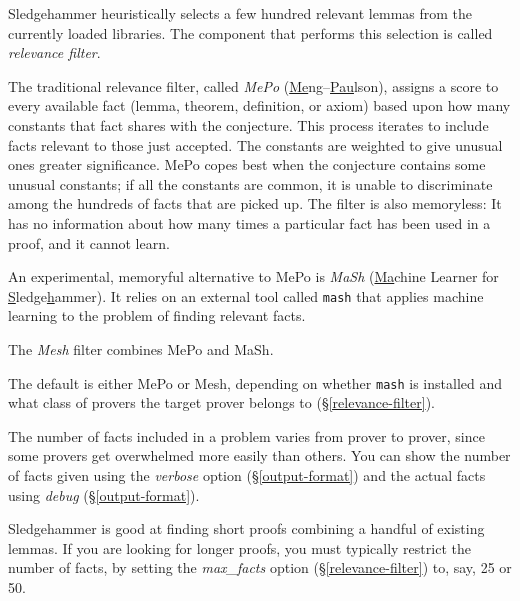 \documentclass[a4paper,12pt]{article}
\begin{document}

Sledgehammer heuristically selects a few hundred relevant lemmas from the
currently loaded libraries. The component that performs this selection is
called \emph{relevance filter}.

\begin{enum}
\item[\labelitemi]
The traditional relevance filter, called \emph{MePo}
(\underline{Me}ng--\underline{Pau}lson), assigns a score to every available fact
(lemma, theorem, definition, or axiom) based upon how many constants that fact
shares with the conjecture. This process iterates to include facts relevant to
those just accepted. The constants are weighted to give unusual ones greater
significance. MePo copes best when the conjecture contains some unusual
constants; if all the constants are common, it is unable to discriminate among
the hundreds of facts that are picked up. The filter is also memoryless: It has
no information about how many times a particular fact has been used in a proof,
and it cannot learn.

\item[\labelitemi]
An experimental, memoryful alternative to MePo is \emph{MaSh}
(\underline{Ma}chine Learner for \underline{S}ledge\underline{h}ammer). It
relies on an external tool called \texttt{mash} that applies machine learning to
the problem of finding relevant facts.

\item[\labelitemi] The \emph{Mesh} filter combines MePo and MaSh.
\end{enum}

The default is either MePo or Mesh, depending on whether \texttt{mash} is
installed and what class of provers the target prover belongs to
(\S\ref{relevance-filter}).

The number of facts included in a problem varies from prover to prover, since
some provers get overwhelmed more easily than others. You can show the number of
facts given using the \textit{verbose} option (\S\ref{output-format}) and the
actual facts using \textit{debug} (\S\ref{output-format}).

Sledgehammer is good at finding short proofs combining a handful of existing
lemmas. If you are looking for longer proofs, you must typically restrict the
number of facts, by setting the \textit{max\_facts} option
(\S\ref{relevance-filter}) to, say, 25 or 50.
\end{document}
